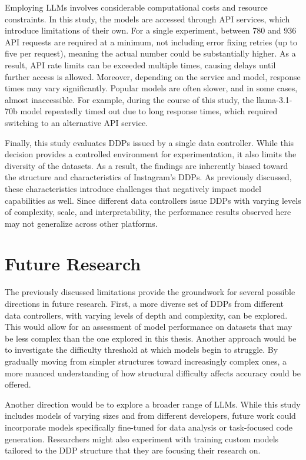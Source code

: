 \documentclass{DESSThesis}
\begin{document}
Employing LLMs involves considerable computational costs and resource constraints. In this study, the models are accessed through API services, which introduce limitations of their own. For a single experiment, between 780 and 936 API requests are required at a minimum, not including error fixing retries (up to five per request), meaning the actual number could be substantially higher. As a result, API rate limits can be exceeded multiple times, causing delays until further access is allowed. Moreover, depending on the service and model, response times may vary significantly. Popular models are often slower, and in some cases, almost inaccessible. For example, during the course of this study, the llama-3.1-70b model repeatedly timed out due to long response times, which required switching to an alternative API service.

Finally, this study evaluates DDPs issued by a single data controller. While this decision provides a controlled environment for experimentation, it also limits the diversity of the datasets. As a result, the findings are inherently biased toward the structure and characteristics of Instagram's DDPs. As previously discussed, these characteristics introduce challenges that negatively impact model capabilities as well. Since different data controllers issue DDPs with varying levels of complexity, scale, and interpretability, the performance results observed here may not generalize across other platforms.

\section{Future Research}

The previously discussed limitations provide the groundwork for several possible directions in future research. First, a more diverse set of DDPs from different data controllers, with varying levels of depth and complexity, can be explored. This would allow for an assessment of model performance on datasets that may be less complex than the one explored in this thesis. Another approach would be to investigate the difficulty threshold at which models begin to struggle. By gradually moving from simpler structures toward increasingly complex ones, a more nuanced understanding of how structural difficulty affects accuracy could be offered.

Another direction would be to explore a broader range of LLMs. While this study includes models of varying sizes and from different developers, future work could incorporate models specifically fine-tuned for data analysis or task-focused code generation. Researchers might also experiment with training custom models tailored to the DDP structure that they are focusing their research on. 
\end{document}
